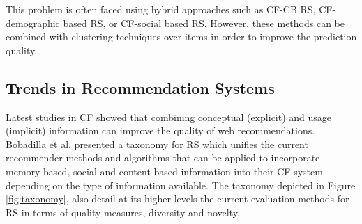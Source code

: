 This problem is often faced using hybrid approaches such as CF-CB RS, CF-demographic based RS, or CF-social based RS\cite{bobadilla2013recommender}. However, these methods can be combined with clustering techniques over items in order to improve the prediction quality.

\subsection{Trends in Recommendation Systems}

Latest studies in CF showed that combining conceptual (explicit) and usage (implicit) information can improve the quality of web recommendations. Bobadilla et al.\cite{bobadilla2013recommender} presented a taxonomy for RS which unifies the current recommender methods and algorithms that can be applied to incorporate memory-based, social and content-based information into their CF system depending on the type of information available. The taxonomy depicted in Figure \ref{fig:taxonomy}, also detail at its higher levels the current evaluation methods for RS in terms of quality measures, diversity and novelty.

